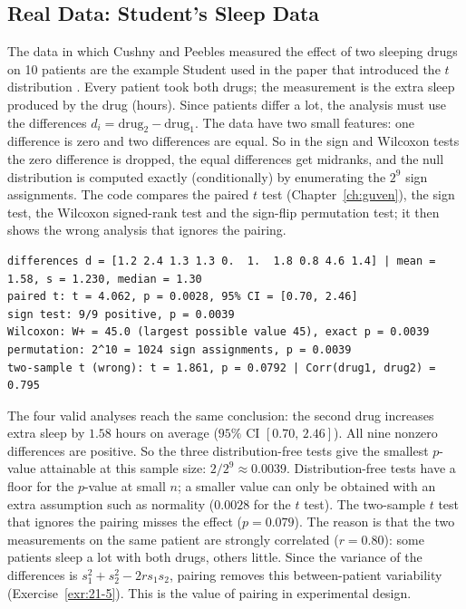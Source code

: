 \documentclass[main.tex]{subfiles}
\begin{document}
\subsection{Real Data: Student's Sleep Data}\label{sec:uyku}
The data in which Cushny and Peebles measured the effect of two sleeping drugs on 10 patients \cite{cushny-peebles05} are the example Student used in the paper that introduced the $t$ distribution \cite{student08}. Every patient took both drugs; the measurement is the extra sleep produced by the drug (hours). Since patients differ a lot, the analysis must use the differences $d_i=\text{drug}_2-\text{drug}_1$. The data have two small features: one difference is zero and two differences are equal. So in the sign and Wilcoxon tests the zero difference is dropped, the equal differences get midranks, and the null distribution is computed exactly (conditionally) by enumerating the $2^9$ sign assignments. The code compares the paired $t$ test (Chapter~\ref{ch:guven}), the sign test, the Wilcoxon signed-rank test and the sign-flip permutation test; it then shows the wrong analysis that ignores the pairing.

\begin{lstlisting}[style=output]
differences d = [1.2 2.4 1.3 1.3 0.  1.  1.8 0.8 4.6 1.4] | mean = 1.58, s = 1.230, median = 1.30
paired t: t = 4.062, p = 0.0028, 95% CI = [0.70, 2.46]
sign test: 9/9 positive, p = 0.0039
Wilcoxon: W+ = 45.0 (largest possible value 45), exact p = 0.0039
permutation: 2^10 = 1024 sign assignments, p = 0.0039
two-sample t (wrong): t = 1.861, p = 0.0792 | Corr(drug1, drug2) = 0.795
\end{lstlisting}

The four valid analyses reach the same conclusion: the second drug increases extra sleep by $1.58$ hours on average ($95\%$ CI $[0.70,\,2.46]$). All nine nonzero differences are positive. So the three distribution-free tests give the smallest $p$-value attainable at this sample size: $2/2^9\approx0.0039$. Distribution-free tests have a floor for the $p$-value at small $n$; a smaller value can only be obtained with an extra assumption such as normality ($0.0028$ for the $t$ test). The two-sample $t$ test that ignores the pairing misses the effect ($p=0.079$). The reason is that the two measurements on the same patient are strongly correlated ($r=0.80$): some patients sleep a lot with both drugs, others little. Since the variance of the differences is $s_1^2+s_2^2-2rs_1s_2$, pairing removes this between-patient variability (Exercise~\ref{exr:21-5}). This is the value of pairing in experimental design.
\end{document}
